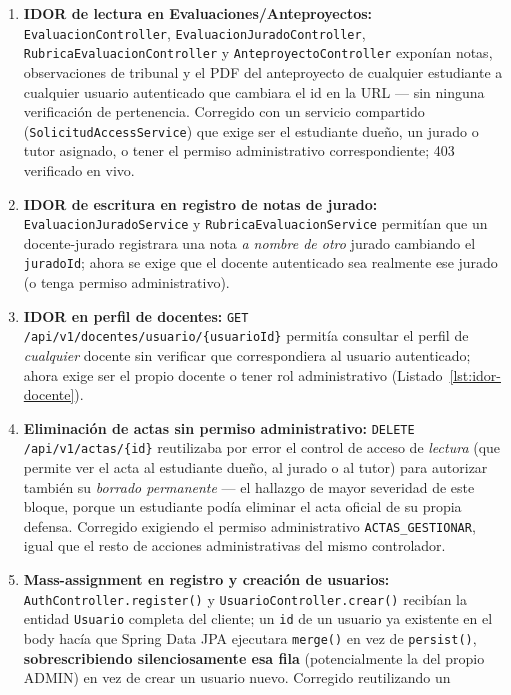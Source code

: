 \begin{enumerate}[nosep]
    \item \textbf{IDOR de lectura en Evaluaciones/Anteproyectos:} \texttt{EvaluacionController},
    \texttt{EvaluacionJuradoController}, \texttt{RubricaEvaluacionController} y
    \texttt{AnteproyectoController} exponían notas, observaciones de tribunal y el PDF del anteproyecto
    de cualquier estudiante a cualquier usuario autenticado que cambiara el id en la URL --- sin ninguna
    verificación de pertenencia. Corregido con un servicio compartido
    (\texttt{SolicitudAccessService}) que exige ser el estudiante dueño, un jurado o tutor asignado, o
    tener el permiso administrativo correspondiente; 403 verificado en vivo.
    \item \textbf{IDOR de escritura en registro de notas de jurado:} \texttt{EvaluacionJuradoService} y
    \texttt{RubricaEvaluacionService} permitían que un docente-jurado registrara una nota \emph{a nombre
    de otro} jurado cambiando el \texttt{juradoId}; ahora se exige que el docente autenticado sea
    realmente ese jurado (o tenga permiso administrativo).
    \item \textbf{IDOR en perfil de docentes:} \texttt{GET /api/v1/docentes/usuario/\{usuarioId\}}
    permitía consultar el perfil de \emph{cualquier} docente sin verificar que correspondiera al usuario
    autenticado; ahora exige ser el propio docente o tener rol administrativo (Listado~\ref{lst:idor-docente}).
    \item \textbf{Eliminación de actas sin permiso administrativo:} \texttt{DELETE
    /api/v1/actas/\{id\}} reutilizaba por error el control de acceso de \emph{lectura} (que permite ver
    el acta al estudiante dueño, al jurado o al tutor) para autorizar también su \emph{borrado
    permanente} --- el hallazgo de mayor severidad de este bloque, porque un estudiante podía eliminar
    el acta oficial de su propia defensa. Corregido exigiendo el permiso administrativo
    \texttt{ACTAS\_GESTIONAR}, igual que el resto de acciones administrativas del mismo controlador.
    \item \textbf{Mass-assignment en registro y creación de usuarios:} \texttt{AuthController.register()}
    y \texttt{UsuarioController.crear()} recibían la entidad \texttt{Usuario} completa del cliente; un
    \texttt{id} de un usuario ya existente en el body hacía que Spring Data JPA ejecutara
    \texttt{merge()} en vez de \texttt{persist()}, \textbf{sobrescribiendo silenciosamente esa fila}
    (potencialmente la del propio ADMIN) en vez de crear un usuario nuevo. Corregido reutilizando un

\end{enumerate}
